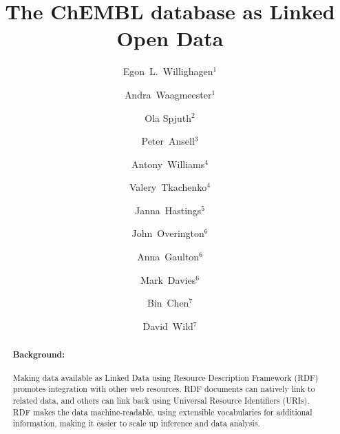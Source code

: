 \documentclass[10pt]{bmc_article}
\newenvironment{bmcformat}{\begin{raggedright}\baselineskip20pt\sloppy\setboolean{publ}{false}}{\end{raggedright}\baselineskip20pt\sloppy}
\begin{document}
\begin{bmcformat}

\title{The ChEMBL database as Linked Open Data}
 
\author{Egon~L.~Willighagen$^{1}$\and
Andra~Waagmeester$^1$\and
Ola Spjuth$^2$\and
Peter~Ansell$^3$\and
Antony~Williams$^4$\and
Valery~Tkachenko$^4$\and
Janna~Hastings$^5$\and
John~Overington$^6$\and
Anna~Gaulton$^6$\and
Mark~Davies$^6$\and
Bin~Chen$^7$\and
David~Wild$^7$
}

\address{\iid(1)Department of Bioinformatics - BiGCaT, Maastricht University, P.O. Box 616, UNS50 Box 19, NL-6200 MD, Maastricht, The Netherlands  \\
\iid(2)Department of Pharmaceutical Biosciences, Uppsala University, PO Box 591, SE-751 24, Uppsala, Sweden \\
\iid(3)University of Queensland, St Lucia, Qld 4072, Australia \\
\iid(4)Royal Society of Chemistry, 904 Tamaras Circle, Wake Forest, NC 27587, U.S.A. \\
\iid(5)Chemoinformatics and Metabolism, European Bioinformatics Institute, POSTAL CODE, Hinxton, United Kingdom \\
\iid(6)EMBL-European Bioinformatics Institute, Wellcome Trust Genome Campus, Hinxton, Cambridgeshire, CB10 1SD, United Kingdom \\ 
\iid(7)School of Informatics and Computing, Indiana University, Bloomington, IN, U.S.A.
}

\maketitle

\begin{abstract}
\paragraph*{Background:}
Making data available as Linked Data using Resource Description Framework (RDF) promotes integration with other web resources.
RDF documents can natively link to related data, and others can link back using Universal Resource Identifiers (URIs).
RDF makes the data machine-readable, using extensible vocabularies for additional information, making it easier
to scale up inference and data analysis.

\end{abstract}
\end{bmcformat}
\end{document}
